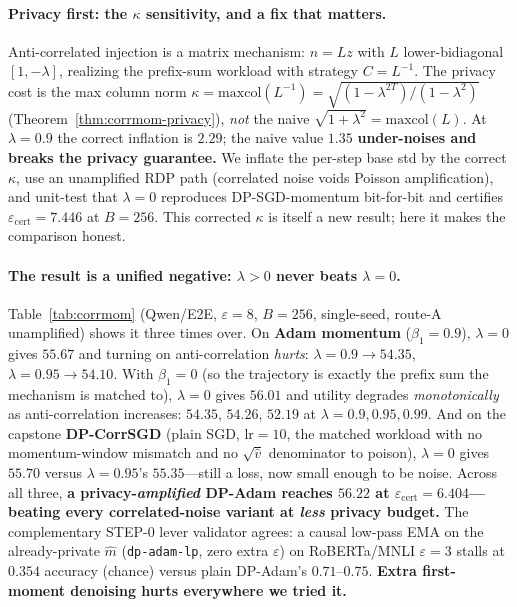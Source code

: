 \documentclass[11pt]{article}
\theoremstyle{plain}
\theoremstyle{definition}
\theoremstyle{remark}
\begin{document}
\paragraph{Privacy first: the $\kappa$ sensitivity, and a fix that matters.}
Anti-correlated injection is a matrix mechanism: $n=Lz$ with $L$ lower-bidiagonal $[1,-\lambda]$,
realizing the prefix-sum workload with strategy $C=L^{-1}$. The privacy cost is the max column norm
$\kappa=\mathrm{maxcol}(L^{-1})=\sqrt{(1-\lambda^{2T})/(1-\lambda^2)}$ (Theorem~\ref{thm:corrmom-privacy}),
\emph{not} the naive $\sqrt{1+\lambda^2}=\mathrm{maxcol}(L)$. At $\lambda{=}0.9$ the correct inflation
is $2.29$; the naive value $1.35$ \textbf{under-noises and breaks the privacy guarantee.} We inflate
the per-step base std by the correct $\kappa$, use an unamplified RDP path (correlated noise voids
Poisson amplification), and unit-test that $\lambda{=}0$ reproduces DP-SGD-momentum bit-for-bit and
certifies $\varepsilon_{\mathrm{cert}}=7.446$ at $B{=}256$. This corrected $\kappa$ is itself a new
result; here it makes the comparison honest.

\paragraph{The result is a unified negative: $\lambda>0$ never beats $\lambda=0$.}
Table~\ref{tab:corrmom} (Qwen/E2E, $\varepsilon{=}8$, $B{=}256$, single-seed, route-A unamplified)
shows it three times over. On \textbf{Adam momentum} ($\beta_1{=}0.9$), $\lambda{=}0$ gives $55.67$
and turning on anti-correlation \emph{hurts}: $\lambda{=}0.9\to54.35$, $\lambda{=}0.95\to54.10$. With
\textbf{$\beta_1{=}0$} (so the trajectory is exactly the prefix sum the mechanism is matched to),
$\lambda{=}0$ gives $56.01$ and utility degrades \emph{monotonically} as anti-correlation increases:
$54.35,\,54.26,\,52.19$ at $\lambda=0.9,0.95,0.99$. And on the capstone \textbf{DP-CorrSGD} (plain
SGD, lr$=10$, the matched workload with no momentum-window mismatch and no $\sqrt{\hat v}$ denominator
to poison), $\lambda{=}0$ gives $55.70$ versus $\lambda{=}0.95$'s $55.35$---still a loss, now small
enough to be noise. Across all three, \textbf{a privacy-\emph{amplified} DP-Adam reaches
$\mathbf{56.22}$ at $\varepsilon_{\mathrm{cert}}{=}6.404$---beating every correlated-noise variant at
\emph{less} privacy budget.} The complementary STEP-0 lever validator agrees: a causal low-pass EMA on
the already-private $\hat m$ (\texttt{dp-adam-lp}, zero extra $\varepsilon$) on RoBERTa/MNLI
$\varepsilon{=}3$ stalls at $0.354$ accuracy (chance) versus plain DP-Adam's $0.71$--$0.75$.
\textbf{Extra first-moment denoising hurts everywhere we tried it.}
\end{document}
